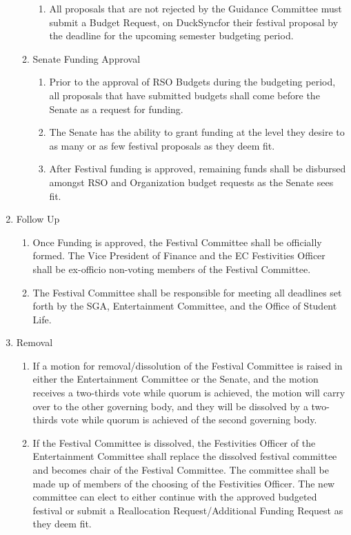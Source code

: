 \documentclass[12pt]{scrreprt}
\begin{document}
\begin{enumerate}
\begin{enumerate}
\begin{enumerate}
          \item All proposals that are not rejected by the Guidance Committee must submit a Budget Request, on DuckSyncfor their festival proposal by the deadline for the upcoming semester budgeting period.
        \end{enumerate}
      \item Senate Funding Approval
        \begin{enumerate}
          \item Prior to the approval of RSO Budgets during the budgeting period, all proposals that have submitted budgets shall come before the Senate as a request for funding.
          \item The Senate has the ability to grant funding at the level they desire to as many or as few festival proposals as they deem fit.
          \item After Festival funding is approved, remaining funds shall be disbursed amongst RSO and Organization budget requests as the Senate sees fit.
        \end{enumerate}
    \end{enumerate}
  \item Follow Up
    \begin{enumerate}
      \item Once Funding is approved, the Festival Committee shall be officially formed. The Vice President of Finance and the EC Festivities Officer shall be ex-officio non-voting members of the Festival Committee.
      \item The Festival Committee shall be responsible for meeting all deadlines set forth by the SGA, Entertainment Committee, and the Office of Student Life.
    \end{enumerate}
  \item Removal
    \begin{enumerate}
      \item If a motion for removal/dissolution of the Festival Committee is raised in either the Entertainment Committee or the Senate, and the motion receives a two-thirds vote while quorum is achieved, the motion will carry over to the other governing body, and they will be dissolved by a two-thirds vote while quorum is achieved of the second governing body.
      \item If the Festival Committee is dissolved, the Festivities Officer of the Entertainment Committee shall replace the dissolved festival committee and becomes chair of the Festival Committee. The committee shall be made up of members of the choosing of the Festivities Officer. The new committee can elect to either continue with the approved budgeted festival or submit a Reallocation Request/Additional Funding Request as they deem fit.

\end{enumerate}
\end{enumerate}
\end{document}
